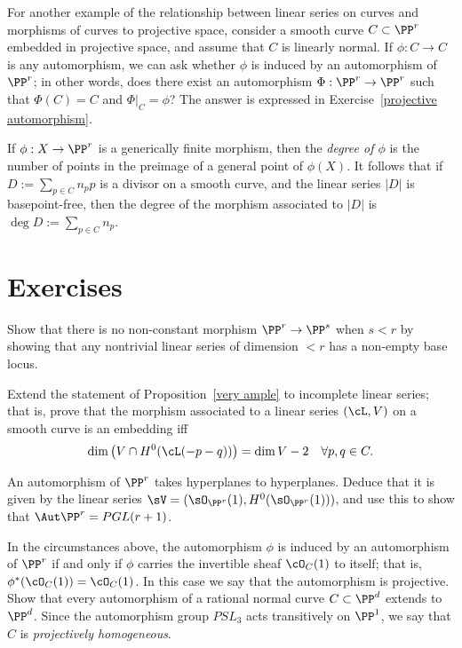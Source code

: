 For another example of the relationship between linear series on curves and morphisms of curves to projective space, consider a smooth curve $C \subset \PP^r$ embedded in projective space, and assume that $C$ is linearly normal. If $\phi : C \to C$ is any automorphism, we can ask whether $\phi$ is induced by an automorphism of $\PP^r$; in other words, does there exist an automorphism $\Phi : \PP^r \to \PP^r$ such that $\Phi(C) = C$ and $\Phi|_C = \phi$? The answer is expressed in Exercise~\ref{projective automorphism}.


If $\phi:X \to \PP^r$ is a generically finite morphism, then the \emph{degree of $\phi$} is the number of points in the preimage of a general point of $\phi(X)$. It follows that if $D := \sum_{p\in C} n_pp$ is a divisor on a smooth curve, and the linear series $|D|$ is basepoint-free, then the degree of the morphism associated to $|D|$ is $\deg D := \sum_{p\in C} n_p$.

\section{Exercises}

\begin{exercise}\label{here there be basepoints}
 Show that there is no non-constant morphism $\PP^r\to \PP^s$ when $s<r$ by showing that any nontrivial linear
 series of dimension $<r$ has a non-empty base locus.
\end{exercise}

\begin{exercise}
Extend the statement of Proposition~\ref{very ample} to incomplete linear series; that is, prove that the morphism associated to a linear series $(\cL, V)$
on a smooth curve is an embedding iff
$$
\dim\big( V \cap H^0(\cL(-p-q))\big) = \dim V - 2 \quad \forall p, q \in C.
$$
\end{exercise}

\begin{exercise}
An automorphism of $\PP^r$ takes hyperplanes to hyperplanes. Deduce that it is given by the linear series
$\sV = (\sO_{\PP^r}(1), H^0(\sO_{\PP^r}(1)))$, and use this to show that $\Aut \PP^r = PGL(r+1)$. 
\end{exercise}

\begin{exercise}\label{projective automorphism}
In the circumstances above, the automorphism $\phi$ is induced by an automorphism of $\PP^r$ if and only if $\phi$ carries the invertible sheaf $\cO_{C}(1)$ to itself; that is, $\phi^*(\cO_{C}(1)) = \cO_{C}(1)$. In this case we say that the automorphism
is projective. Show that every automorphism of a rational normal curve $C \subset \PP^d$  extends to $\PP^d$. Since the
automorphism group $PSL_3$ acts transitively on $\PP^1$, we say that
$C$ is \emph{projectively homogeneous}.


\end{exercise}

